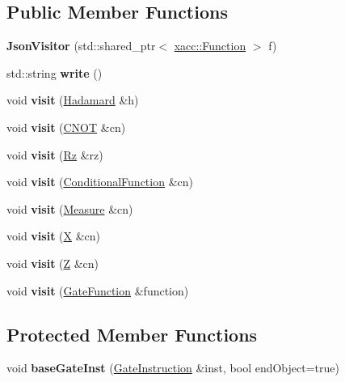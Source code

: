 \subsection*{Public Member Functions}
\begin{DoxyCompactItemize}
\item 
\mbox{\label{a01340_a7b2bf70217828adf6457e3fee7e13056}} 
{\bfseries Json\+Visitor} (std\+::shared\+\_\+ptr$<$ \hyperlink{a02456}{xacc\+::\+Function} $>$ f)
\item 
\mbox{\label{a01340_a78e2b6c71755a0fed97de43e0b7edc82}} 
std\+::string {\bfseries write} ()
\item 
\mbox{\label{a01340_afdebbabdbae5ecb3a508f02ffe056fd4}} 
void {\bfseries visit} (\hyperlink{a01308}{Hadamard} \&h)
\item 
\mbox{\label{a01340_a83c17c122c0e02242189b3564290f3e9}} 
void {\bfseries visit} (\hyperlink{a01300}{C\+N\+OT} \&cn)
\item 
\mbox{\label{a01340_a76c3593f3933631c2dbca74b7b216534}} 
void {\bfseries visit} (\hyperlink{a01316}{Rz} \&rz)
\item 
\mbox{\label{a01340_aea63f829d8c926e567ef6a09a0ca779e}} 
void {\bfseries visit} (\hyperlink{a01304}{Conditional\+Function} \&cn)
\item 
\mbox{\label{a01340_a71a9c4b78152af3366f8ee93b2e4d9da}} 
void {\bfseries visit} (\hyperlink{a01312}{Measure} \&cn)
\item 
\mbox{\label{a01340_a2862d01b12da46374c16a3baf33bb4ca}} 
void {\bfseries visit} (\hyperlink{a01320}{X} \&cn)
\item 
\mbox{\label{a01340_a1f10eae245651cf48195db1a56cf3338}} 
void {\bfseries visit} (\hyperlink{a01324}{Z} \&cn)
\item 
\mbox{\label{a01340_af80f9bd5dda7f53279baa9823c715f60}} 
void {\bfseries visit} (\hyperlink{a01272}{Gate\+Function} \&function)
\end{DoxyCompactItemize}
\subsection*{Protected Member Functions}
\begin{DoxyCompactItemize}
\item 
\mbox{\label{a01340_adf4795f80bf4773af8babb9ee7d38c96}} 
void {\bfseries base\+Gate\+Inst} (\hyperlink{a01276}{Gate\+Instruction} \&inst, bool end\+Object=true)
\end{DoxyCompactItemize}

